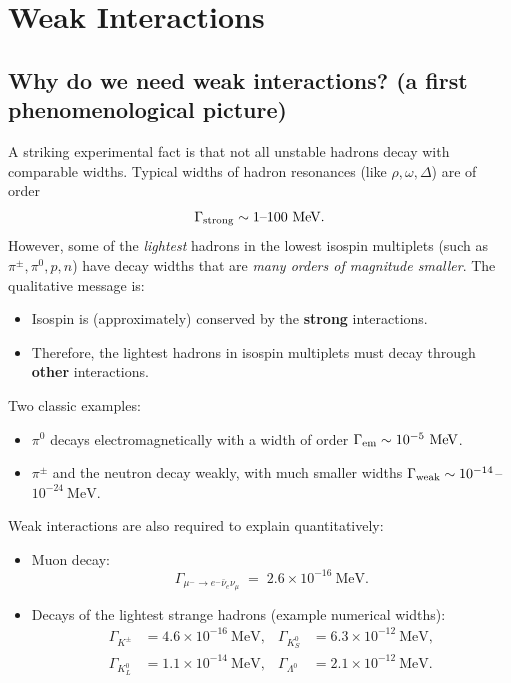 
\chapter{Weak Interactions}
\label{ch:weak_interactions}

\section{Why do we need weak interactions? (a first phenomenological picture)}
A striking experimental fact is that not all unstable hadrons decay with comparable widths.
Typical widths of hadron resonances (like $\rho,\omega,\Delta$) are of order
\begin{equation}
\Gamma_{\rm strong}\sim 1\text{--}100~\text{MeV}.
\end{equation}
However, some of the \emph{lightest} hadrons in the lowest isospin multiplets (such as $\pi^\pm,\pi^0,p,n$)
have decay widths that are \emph{many orders of magnitude smaller}. The qualitative message is:
\begin{itemize}
  \item Isospin is (approximately) conserved by the \textbf{strong} interactions.
  \item Therefore, the lightest hadrons in isospin multiplets must decay through \textbf{other} interactions.
\end{itemize}

Two classic examples:
\begin{itemize}
  \item $\pi^0$ decays electromagnetically with a width of order $\Gamma_{\rm em}\sim 10^{-5}~\text{MeV}$.
  \item $\pi^\pm$ and the neutron decay weakly, with much smaller widths $\Gamma_{\rm weak}\sim 10^{-14}$--$10^{-24}~\text{MeV}$.
\end{itemize}

Weak interactions are also required to explain quantitatively:
\begin{itemize}
  \item Muon decay:
  \begin{equation}
    \Gamma_{\mu^- \to e^- \bar\nu_e \nu_\mu}\;=\;2.6\times 10^{-16}~\text{MeV}.
  \end{equation}
  \item Decays of the lightest strange hadrons (example numerical widths):
  \begin{align}
    \Gamma_{K^\pm} &= 4.6\times 10^{-16}~\text{MeV}, &
    \Gamma_{K_S^0} &= 6.3\times 10^{-12}~\text{MeV},\\
    \Gamma_{K_L^0} &= 1.1\times 10^{-14}~\text{MeV}, &
    \Gamma_{\Lambda^0} &= 2.1\times 10^{-12}~\text{MeV}.
  \end{align}
\end{itemize}

